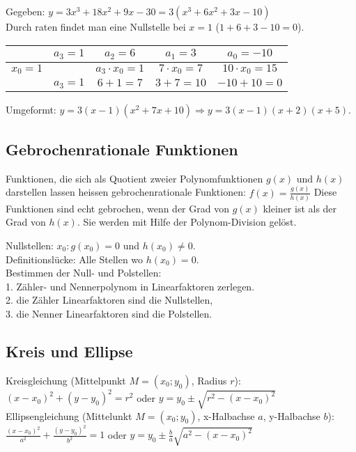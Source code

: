 Gegeben: $y = 3 x^3 + 18 x^2 + 9 x - 30 = 3 (x^3 + 6 x^2 + 3 x - 10)$\\
Durch raten findet man eine Nullstelle bei $x = 1$ ($1 + 6 + 3 - 10 = 0$). 
\begin{tabular}{c|c|c|c|c}
			& $a_3 = 1$ 	& $a_2 = 6$ 			& $a_1 = 3$ 			& $a_0 = - 10$ 			\\ \hline
$x_0 = 1$ 	& 				& $a_3 \cdot x_0 = 1$	& $7 \cdot x_0 = 7$ 	& $10 \cdot x_0 = 15$	\\ \hline
			& $a_3 = 1$		& $6 + 1 = 7$			& $3 + 7 = 10$			& $-10 + 10 = 0$		\\ \hline
\end{tabular}

Umgeformt: $y = 3 (x - 1)(x^2 + 7 x + 10) \Rightarrow y = 3 (x - 1)(x + 2)(x + 5)$.\\

\subsection{Gebrochenrationale Funktionen}
Funktionen, die sich als Quotient zweier Polynomfunktionen $g(x)$ und $h(x)$ darstellen lassen heissen gebrochenrationale Funktionen: $f(x) = \frac{g(x)}{h(x)}$
Diese Funktionen sind echt gebrochen, wenn der Grad von $g(x)$ kleiner ist als der Grad von $h(x)$.
Sie werden mit Hilfe der Polynom-Division gelöst.

Nullstellen: $x_0: g(x_0) = 0$ und $h(x_0) \neq 0$.\\
Definitionslücke: Alle Stellen wo $h(x_0) = 0$.\\
Bestimmen der Null- und Polstellen:\\
1. Zähler- und Nennerpolynom in Linearfaktoren zerlegen.\\
2. die Zähler Linearfaktoren sind die Nullstellen,\\ 
3. die Nenner Linearfaktoren sind die Polstellen.\\

\subsection{Kreis und Ellipse}
Kreisgleichung (Mittelpunkt $M = (x_0; y_0)$, Radius $r$):\\
$(x - x_0)^2 + (y - y_0)^2 = r^2 $ oder $y = y_0 \pm \sqrt{r^2 - (x - x_0)^2}$\\

Ellipsengleichung (Mittelunkt $M = (x_0; y_0)$, x-Halbachse $a$, y-Halbachse $b$):\\ 
$\frac{(x - x_0)^2}{a^2} + \frac{(y - y_0)^2}{b^2} = 1$ oder $y = y_0 \pm \frac{b}{a} \sqrt{a^2 - (x - x_0)^2}$
